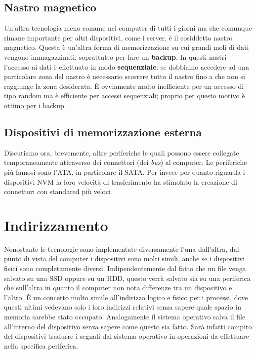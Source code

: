 \subsection{Nastro magnetico}
Un'altra tecnologia meno comune nei computer di tutti i giorni ma che comunque rimane importante per altri dispositivi, come i server, è il cosiddetto  nastro magnetico. Questa è un'altra forma di memorizzazione su cui grandi moli di dati vengono immagazzinati, soprattutto per fare un \textbf{backup}. In questi nastri l'accesso ai dati è effettuato in modo \textbf{sequenziale}: se dobbiamo accedere ad una particolare zona del nastro è necessario scorrere tutto il nastro fino a che non si raggiunge la zona desiderata. È ovviamente molto inefficiente per un accesso di tipo random ma è efficiente per accessi sequenziali; proprio per questo motivo è ottimo per i backup. 

% 
\subsection{Dispositivi di memorizzazione esterna}
Discutiamo ora, brevemente, altre periferiche le quali possono essere collegate temporaneamente attraverso dei connettori (dei \textit{bus}) al computer. Le periferiche più famosi sono l'ATA, in particolare il SATA. Per invece per quanto riguarda i dispositivi NVM la loro velocità di trasferimento ha stimolato la creazione di connettori con standared più veloci 

% 
\section{Indirizzamento}
Nonostante le tecnologie sono implementate diversamente l'una dall'altra, dal punto di vista del computer i dispositivi sono molti simili, anche se i dispositivi fisici sono completamente diversi. Indipendentemente dal fatto che un file venga salvato su una SSD oppure su un HDD, questo verrà salvato sia su una periferica che sull'altra in quanto il computer non nota differenze tra un dispositivo e l'altro. È un concetto molto simile all'indirizzo logico e fisico per i processi, dove questi ultimi vedevano solo i loro indirizzi relativi senza sapere quale spazio in memoria sarebbe stato occupato. Analogamente il sistema operativo salva il file all'interno del dispositivo senza sapere come questo sia fatto. Sarà infatti compito del dispositivi tradurre i segnali dal sistema operativo in operazioni da effettuare nella specifica periferica.

